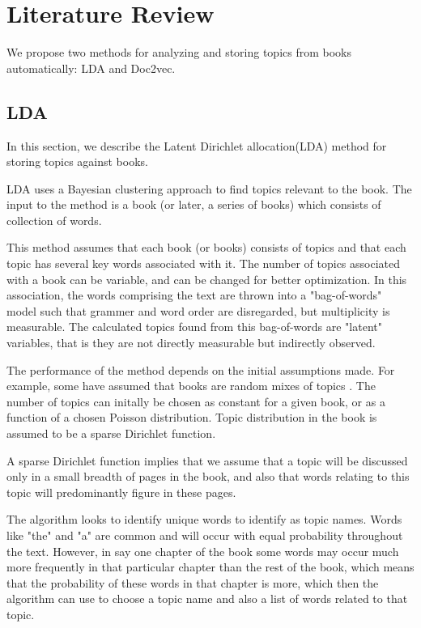 
\section{Literature Review} \label{section:algorithms}
We propose two methods for analyzing and storing topics from books automatically: LDA and Doc2vec. 

\subsection{LDA}
\par In this section, we describe the Latent Dirichlet allocation(LDA) method for storing topics against books. 
\par LDA uses a Bayesian clustering approach to find topics relevant to the book. \cite{RefWorks:doc:5a721fb5e4b0d609eec83aa1} The input to the method is a book (or later, a series of books) which consists of collection of words. 
\par This method assumes that each book (or books) consists of topics and that each topic has several key words associated with it. The number of topics associated with a book can be variable, and can be changed for better optimization. In this association, the words comprising the text are thrown into a "bag-of-words" model such that grammer and word order are disregarded, but multiplicity is measurable. The calculated topics found from this bag-of-words are "latent" variables, that is they are not directly measurable but indirectly observed.  
\par The performance of the method depends on the initial assumptions made. For example, some have assumed that books are random mixes of topics \cite{RefWorks:doc:5a721e4ae4b095066af57410}. The number of topics can initally be chosen as constant for a given book, or as a function of a chosen Poisson distribution. \cite{RefWorks:doc:5a721e4ae4b095066af57410} Topic distribution in the book is assumed to be a sparse Dirichlet function.
\par A sparse Dirichlet function implies that we assume that a topic will be discussed only in a small breadth of pages in the book, and also that words relating to this topic will predominantly figure in these pages.
\par The algorithm looks to identify unique words to identify as topic names. Words like "the" and "a" are common and will occur with equal probability throughout the text. However, in say one chapter of the book some words may occur much more frequently in that particular chapter than the rest of the book, which means that the probability of these words in that chapter is more, which then the algorithm can use to choose a topic name and also a list of words related to that topic.


